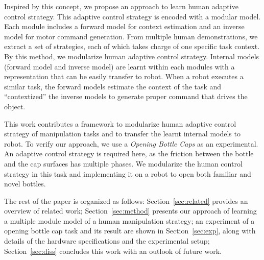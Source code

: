 Inspired by this concept, we propose an approach to learn human adaptive control strategy. This adaptive control strategy is encoded with a modular model. Each module includes a forward model for context estimation and an inverse model for motor command generation. From multiple human demonstrations, we extract a set of strategies, each of which takes charge of one specific task context. By this method, we modularize human adaptive control strategy. Internal models (forward model and inverse model) are learnt within each modules with a representation that can be easily transfer to robot. When a robot executes a similar task, the forward models estimate the context of the task and ``contextized'' the inverse models to generate proper command that drives the object.

This work contributes a framework to modularize human adaptive control strategy of manipulation tasks and to transfer the learnt internal models to robot. To verify our approach, we use a \emph{Opening Bottle Caps} as an experimental. An adaptive control strategy is required here, as the friction between the bottle and the cap surfaces has multiple phases. We modularize the human control strategy in this task and implementing it on a robot to open both familiar and novel bottles.

The rest of the paper is organized as follows: Section~\ref{sec:related} provides an overview of related work; Section~\ref{sec:method} presents our approach of learning a multiple module model of a human manipulation strategy; an experiment of a opening bottle cap task and its result are shown in Section~\ref{sec:exp}, along with details of the hardware specifications and the experimental setup; Section~\ref{sec:diss} concludes this work with an outlook of future work. 